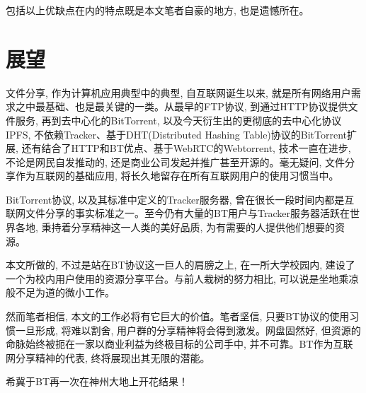 包括以上优缺点在内的特点既是本文笔者自豪的地方, 也是遗憾所在。

\section{展望}

文件分享, 作为计算机应用典型中的典型, 自互联网诞生以来, 就是所有网络用户需求之中最基础、也是最关键的一类。从最早的FTP协议, 到通过HTTP协议提供文件服务, 再到去中心化的BitTorrent, 以及今天衍生出的更彻底的去中心化协议IPFS\cite{DBLP:journals/corr/Benet14}, 不依赖Tracker、基于DHT\cite{andrewloewenstern2008bep0005}(Distributed Hashing Table)协议的BitTorrent扩展, 还有结合了HTTP和BT优点、基于WebRTC的Webtorrent, 技术一直在进步, 不论是网民自发推动的, 还是商业公司发起并推广甚至开源的。毫无疑问, 文件分享作为互联网的基础应用, 将长久地留存在所有互联网用户的使用习惯当中。

BitTorrent协议, 以及其标准中定义的Tracker服务器, 曾在很长一段时间内都是互联网文件分享的事实标准之一。至今仍有大量的BT用户与Tracker服务器活跃在世界各地, 秉持着分享精神这一人类的美好品质, 为有需要的人提供他们想要的资源。

本文所做的, 不过是站在BT协议这一巨人的肩膀之上, 在一所大学校园内, 建设了一个为校内用户使用的资源分享平台。与前人栽树的努力相比, 可以说是坐地乘凉般不足为道的微小工作。

然而笔者相信, 本文的工作必将有它巨大的价值。笔者坚信, 只要BT协议的使用习惯一旦形成, 将难以割舍, 用户群的分享精神将会得到激发。网盘固然好, 但资源的命脉始终被扼在一家以商业利益为终极目标的公司手中, 并不可靠。BT作为互联网分享精神的代表, 终将展现出其无限的潜能。

希冀于BT再一次在神州大地上开花结果！




